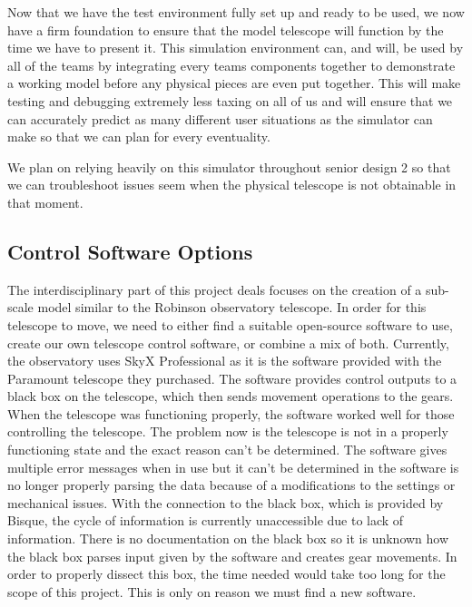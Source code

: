\documentclass[12pt]{report}
\begin{document}
Now that we have the test environment fully set up and ready to be used, we now have a firm foundation to ensure that the model telescope will function by the time we have to present it. This simulation environment can, and will, be used by all of the teams by integrating every teams components together to demonstrate a working model before any physical pieces are even put together. This will make testing and debugging extremely less taxing on all of us and will ensure that we can accurately predict as many different user situations as the simulator can make so that we can plan for every eventuality.

We plan on relying heavily on this simulator throughout senior design 2 so that we can troubleshoot issues seem when the physical telescope is not obtainable in that moment.

\subsection*{Control Software Options}

The interdisciplinary part of this project deals focuses on the creation of a sub-scale model similar to the Robinson observatory telescope. In order for this telescope to move, we need to either find a suitable open-source software to use, create our own telescope control software, or combine a mix of both. Currently, the observatory uses SkyX Professional as it is the software provided with the Paramount telescope they purchased. The software provides control outputs to a black box on the telescope, which then sends movement operations to the gears. When the telescope was functioning properly, the software worked well for those controlling the telescope. The problem now is the telescope is not in a properly functioning state and the exact reason can’t be determined. The software gives multiple error messages when in use but it can’t be determined in the software is no longer properly parsing the data because of a modifications to the settings or mechanical issues. With the connection to the black box, which is provided by Bisque, the cycle of information is currently unaccessible due to lack of information. There is no documentation on the black box so it is unknown how the black box parses input given by the software and creates gear movements. In order to properly dissect this box, the time needed would take too long for the scope of this project. This is only on reason we must find a new software.
\end{document}
